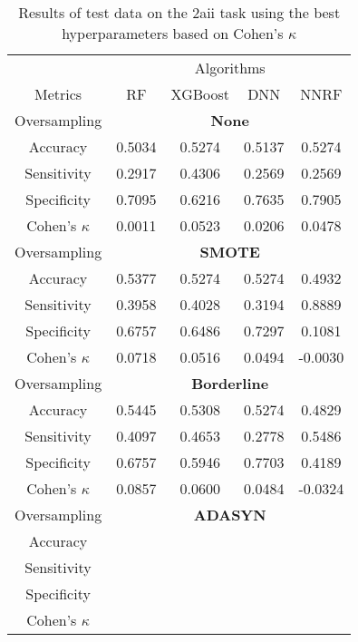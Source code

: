 \begin{table}[!htb]
\centering
\caption{Results of test data on the 2aii task using the best hyperparameters based on Cohen's $\kappa$}
\label{tab:2aii_test_results}
\begin{tabular}{c | c c c c}
\hline
 & \multicolumn{4}{c}{Algorithms}\\ 
Metrics &RF & XGBoost & DNN & NNRF\\ 
\hline
Oversampling &\multicolumn{4}{|c}{\textbf{None}}\\ 
\hline
Accuracy & 0.5034 & 0.5274 & 0.5137 & 0.5274\\ 
Sensitivity & 0.2917 & 0.4306 & 0.2569 & 0.2569\\ 
Specificity & 0.7095 & 0.6216 & 0.7635 & 0.7905\\ 
Cohen's $\kappa$ & 0.0011 & 0.0523 & 0.0206 & 0.0478\\ 
\hline
Oversampling &\multicolumn{4}{|c}{\textbf{SMOTE}}\\ 
\hline
Accuracy & 0.5377 & 0.5274 & 0.5274 & 0.4932\\ 
Sensitivity & 0.3958 & 0.4028 & 0.3194 & 0.8889\\ 
Specificity & 0.6757 & 0.6486 & 0.7297 & 0.1081\\ 
Cohen's $\kappa$ & 0.0718 & 0.0516 & 0.0494 & -0.0030\\ 
\hline
Oversampling &\multicolumn{4}{|c}{\textbf{Borderline}}\\ 
\hline
Accuracy & 0.5445 & 0.5308 & 0.5274 & 0.4829\\ 
Sensitivity & 0.4097 & 0.4653 & 0.2778 & 0.5486\\ 
Specificity & 0.6757 & 0.5946 & 0.7703 & 0.4189\\ 
Cohen's $\kappa$ & 0.0857 & 0.0600 & 0.0484 & -0.0324\\ 
\hline
Oversampling &\multicolumn{4}{|c}{\textbf{ADASYN}}\\ 
\hline
Accuracy &  &  &  & \\ 
Sensitivity &  &  &  & \\ 
Specificity &  &  &  & \\ 
Cohen's $\kappa$ &  &  &  & \\ 
\hline
\end{tabular}
\end{table}

